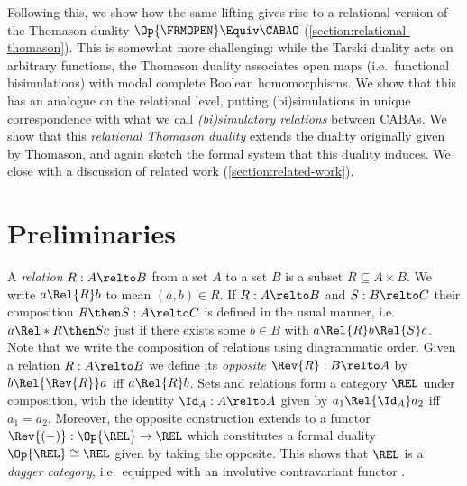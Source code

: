 \documentclass[a4paper,UKenglish,cleveref, autoref]{lipics-v2021}
\begin{document}
Following this, we show how the same lifting gives rise to a relational version
of the Thomason duality $\Op{\FRMOPEN} \Equiv \CABAO$
(\cref{section:relational-thomason}). This is somewhat more challenging: while
the Tarski duality acts on arbitrary functions, the Thomason duality associates
open maps (i.e.\ functional bisimulations) with modal complete Boolean
homomorphisms. We show that this has an analogue on the relational level,
putting (bi)simulations in unique correspondence with what we call
\emph{(bi)simulatory relations} between CABAs. We show that this
\emph{relational Thomason duality} extends the duality originally given by
Thomason, and again sketch the formal system that this duality induces.
We close with a discussion of related work (\cref{section:related-work}).


\section{Preliminaries}\label{section:preliminaries}

A \emph{relation} $R : A \relto B$ from a set $A$ to a set $B$ is a subset $R
\subseteq A \times B$. We write $a \Rel{R} b$ to mean $(a, b) \in R$. If $R : A
\relto B$ and $S : B \relto C$ their composition $R \then S : A \relto C$ is
defined in the usual manner, i.e.\ $a \Rel*{R \then S} c$ just if there exists
some $b \in B$ with $a \Rel{R} b \Rel{S} c$. Note that we write the composition
of relations using diagrammatic order. Given a relation $R : A \relto B$ we
define its \emph{opposite} $\Rev{R} : B \relto A$ by $b \Rel{\Rev{R}} a$ iff $a
\Rel{R} b$. Sets and relations form a category $\REL$ under composition, with
the identity $\Id_A : A \relto A$ given by $a_1 \Rel{\Id_A} a_2$ iff $a_1 =
a_2$. Moreover, the opposite construction extends to a functor \(\Rev{(-)} :
\Op{\REL} \to \REL\) which constitutes a formal duality $\Op{\REL} \cong \REL$
given by taking the opposite. This shows that $\REL$ is a \emph{dagger
category}, i.e.\ equipped with an involutive contravariant functor \cite[\S
2.3.1]{heunen_2019}.
\end{document}
